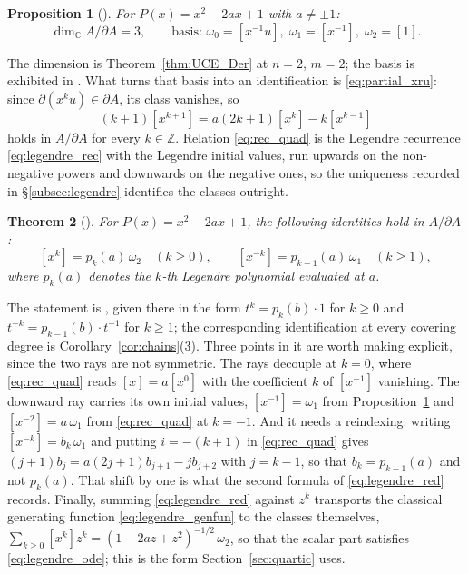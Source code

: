 \documentclass[11pt]{amsart}
\newtheorem{theorem}{Theorem}[section]
\newtheorem{proposition}[theorem]{Proposition}
\theoremstyle{definition}
\theoremstyle{remark}
\newcommand{\C}{\mathbb{C}}
\newcommand{\Z}{\mathbb{Z}}
\newcommand{\pa}{\partial}
\begin{document}
\begin{proposition}[{\cite[\S2.2]{CoxZhao2018}}]\label{prop:basis}
For $P(x) = x^2-2ax+1$ with $a\neq\pm 1$:
\[
  \dim_\C A/\pa A = 3,\qquad
  \text{basis: }\omega_0 = [x^{-1}u],\;\omega_1 = [x^{-1}],\;
  \omega_2 = [1].
\]
\end{proposition}

The dimension is Theorem~\ref{thm:UCE_Der} at $n=2$, $m=2$; the basis is
exhibited in \cite[\S2.2]{CoxZhao2018}. What turns that basis into an
identification is \eqref{eq:partial_xru}: since $\pa(x^ku)\in\pa A$, its class
vanishes, so
\begin{equation}\label{eq:rec_quad}
  (k+1)[x^{k+1}] = a(2k+1)[x^k] - k[x^{k-1}]
\end{equation}
holds in $A/\pa A$ for every $k\in\Z$. Relation \eqref{eq:rec_quad} is the Legendre recurrence
\eqref{eq:legendre_rec} with the Legendre initial values, run upwards on the
non-negative powers and downwards on the negative ones, so the uniqueness
recorded in \S\ref{subsec:legendre} identifies the classes outright.

\begin{theorem}[{\cite[\S2.2]{CoxZhao2018}}]
\label{thm:legendre_ident}
For $P(x) = x^2-2ax+1$, the following identities hold in $A/\pa A$\textup{:}
\begin{equation}\label{eq:legendre_red}
  [x^k] = p_k(a)\,\omega_2 \quad (k\geq 0),\qquad
  [x^{-k}] = p_{k-1}(a)\,\omega_1 \quad (k\geq 1),
\end{equation}
where $p_k(a)$ denotes the $k$-th Legendre polynomial evaluated at $a$.
\end{theorem}

The statement is \cite[(2.22)]{CoxZhao2018}, given there in the form
$t^k=p_k(b)\cdot1$ for $k\geq0$ and $t^{-k}=p_{k-1}(b)\cdot t^{-1}$ for
$k\geq1$; the corresponding identification at every covering degree is
Corollary~\ref{cor:chains}(3). Three points in it are worth making explicit,
since the two rays are not symmetric. The rays decouple at $k=0$, where
\eqref{eq:rec_quad} reads $[x]=a[x^0]$ with the coefficient $k$ of $[x^{-1}]$
vanishing. The downward ray carries its own initial values, $[x^{-1}]=\omega_1$
from Proposition~\ref{prop:basis} and $[x^{-2}]=a\,\omega_1$ from
\eqref{eq:rec_quad} at $k=-1$. And it needs a reindexing: writing
$[x^{-k}]=b_k\,\omega_1$ and putting $i=-(k+1)$ in \eqref{eq:rec_quad} gives
$(j+1)b_j=a(2j+1)b_{j+1}-jb_{j+2}$ with $j=k-1$, so that $b_k=p_{k-1}(a)$ and
not $p_k(a)$. That shift by one is what the second formula of
\eqref{eq:legendre_red} records. Finally, summing \eqref{eq:legendre_red}
against $z^k$ transports the classical generating function
\eqref{eq:legendre_genfun} to the classes themselves,
$\sum_{k\geq0}[x^k]z^k=(1-2az+z^2)^{-1/2}\,\omega_2$, so that the scalar part
satisfies \eqref{eq:legendre_ode}; this is the form Section~\ref{sec:quartic}
uses.
\end{document}
